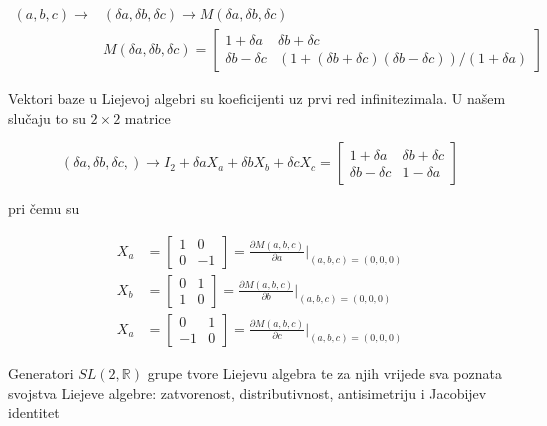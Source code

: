 \begin{equation*}
\begin{split}
(a,b,c)\to& (\delta a,\delta b,\delta c)\to M(\delta a,\delta b,\delta c)\\
& M(\delta a,\delta b,\delta c)=\begin{bmatrix}
1+\delta a & \delta b+\delta c \\
\delta b-\delta c & (1+(\delta b+\delta c)(\delta b-\delta c))/(1+\delta a)
\end{bmatrix}
\end{split}
\end{equation*}

\noindent Vektori baze u Liejevoj algebri su koeficijenti uz prvi red infinitezimala. U našem slučaju to su $2\times 2$ matrice

\begin{equation*}
(\delta a,\delta b,\delta c,)\to I_2+\delta a X_a+\delta b X_b+ \delta c X_c=\begin{bmatrix}
1+\delta a & \delta b+\delta c \\
\delta b-\delta c & 1-\delta a
\end{bmatrix}
\end{equation*}

\noindent pri čemu su

\begin{equation*}
\begin{split}
X_a&=\begin{bmatrix}
1 & 0 \\
0 & -1
\end{bmatrix}=\frac{\partial M(a,b,c)}{\partial a}\Bigg |_{(a,b,c)=(0,0,0)}\\
X_b&=\begin{bmatrix}
0 & 1 \\
1 & 0
\end{bmatrix}=\frac{\partial M(a,b,c)}{\partial b}\Bigg |_{(a,b,c)=(0,0,0)}\\
X_a&=\begin{bmatrix}
0 & 1 \\
-1 & 0
\end{bmatrix}=\frac{\partial M(a,b,c)}{\partial c}\Bigg |_{(a,b,c)=(0,0,0)}
\end{split}
\end{equation*}

\noindent Generatori $SL(2,\mathbb{R})$ grupe tvore Liejevu algebra te za njih vrijede sva poznata svojstva Liejeve algebre: zatvorenost, distributivnost, antisimetriju i Jacobijev identitet

